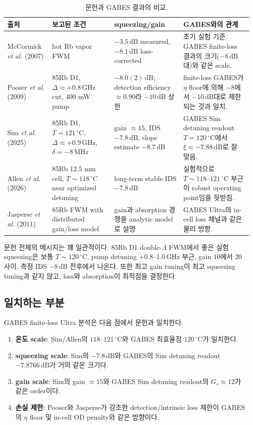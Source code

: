 \documentclass[11pt,a4paper]{article}
\newcommand{\dB}{\,\mathrm{dB}}
\newcommand{\GHz}{\,\mathrm{GHz}}
\newcommand{\MHz}{\,\mathrm{MHz}}
\newcommand{\degC}{\,^{\circ}\mathrm{C}}
\begin{document}
\begin{table}[h]
\centering
\caption{문헌과 GABES 결과의 비교.}
\label{tab:literature}
\begin{tabular}{p{3.3cm}p{3.4cm}p{3.0cm}p{4.8cm}}
\toprule
출처 & 보고된 조건 & squeezing/gain & GABES와의 관계\\
\midrule
McCormick \textit{et al.} (2007) &
hot Rb vapor FWM &
$-3.5\dB$ measured, $-8.1\dB$ loss-corrected &
초기 실험 기준. GABES finite-loss 결과의 크기($-8\dB$대)와 같은 scale.\\
\addlinespace
Pooser \textit{et al.} (2009) &
85Rb D1, $\Delta\approx+0.8\GHz$ cut, 400 mW pump &
$-8.0(2)\dB$; detection efficiency $\approx0.90$라 $-10\dB$ 상한 &
finite-loss GABES가 $\eta$ floor에 의해 $-8$에서 $-10\dB$대로 제한되는 것과 일치.\\
\addlinespace
Sim \textit{et al.} (2025) &
85Rb D1, $T=121\degC$, $\Delta\approx+0.9\GHz$, $\delta=-8\MHz$ &
gain $\approx15$, IDS $-7.8\dB$, slope estimate $-8.7\dB$ &
GABES Sim detuning readout $T=120\degC$에서 $\xi\approx-7.88\dB$로 잘 맞음.\\
\addlinespace
Allen \textit{et al.} (2026) &
85Rb 12.5 mm cell, $T\sim118\degC$ near optimized detuning &
long-term stable IDS $-7.8\dB$ &
실험적으로 $T\sim118\text{--}121\degC$ 부근이 robust operating point임을 뒷받침.\\
\addlinespace
Jasperse \textit{et al.} (2011) &
85Rb FWM with distributed gain/loss model &
gain과 absorption 경쟁을 analytic model로 설명 &
GABES Ultra의 in-cell loss 채널과 같은 물리 방향.\\
\bottomrule
\end{tabular}
\end{table}

문헌 전체의 메시지는 꽤 일관적이다. 85Rb D1 double-$\Lambda$ FWM에서 좋은 실험 squeezing은
보통 $T\sim120\degC$, pump detuning $+0.8\text{--}1.0\GHz$ 부근, gain $10$에서 $20$ 사이,
측정 IDS $-8\dB$ 전후에서 나온다. 또한 최고 gain tuning이 최고 squeezing tuning과 같지
않고, loss와 absorption이 최적점을 결정한다.

\subsection{일치하는 부분}
GABES finite-loss Ultra 분석은 다음 점에서 문헌과 일치한다.

\begin{enumerate}[nosep]
\item \textbf{온도 scale}: Sim/Allen의 $118\text{--}121\degC$와 GABES 최효율점
      $120\degC$가 일치한다.
\item \textbf{squeezing scale}: Sim의 $-7.8\dB$와 GABES의 Sim detuning readout
      $-7.8766\dB$가 거의 같은 크기다.
\item \textbf{gain scale}: Sim의 gain $\approx15$와 GABES Sim detuning readout의
      $G_s\approx12$가 같은 order이다.
\item \textbf{손실 제한}: Pooser와 Jasperse가 강조한 detection/intrinsic loss 제한이
      GABES의 $\eta$ floor 및 in-cell OD penalty와 같은 방향이다.
\end{enumerate}
\end{document}
